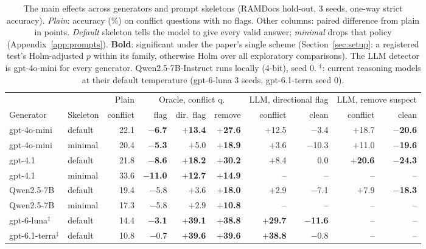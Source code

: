 \begin{table}[t]
\centering\small
\setlength{\tabcolsep}{4pt}
\begin{tabular}{llrrrrrrrr}
\toprule
& & Plain & \multicolumn{3}{c}{Oracle, conflict q.} & \multicolumn{2}{c}{LLM, directional flag} & \multicolumn{2}{c}{LLM, remove suspect} \\
\cmidrule(lr){4-6}\cmidrule(lr){7-8}\cmidrule(lr){9-10}
Generator & Skeleton & conflict & flag & dir.\ flag & remove & conflict & clean & conflict & clean \\
\midrule
gpt-4o-mini & default & 22.1 & \textbf{$-$6.7} & \textbf{$+$13.4} & \textbf{$+$27.6} & $+$12.5 & $-$3.4 & $+$18.7 & \textbf{$-$20.6} \\
gpt-4o-mini & minimal & 20.4 & \textbf{$-$5.3} & $+$5.0 & \textbf{$+$18.9} & $+$3.6 & $-$10.3 & $+$11.0 & \textbf{$-$19.6} \\
gpt-4.1 & default & 21.8 & \textbf{$-$8.6} & \textbf{$+$18.2} & \textbf{$+$30.2} & $+$8.4 & 0.0 & \textbf{$+$20.6} & \textbf{$-$24.3} \\
gpt-4.1 & minimal & 33.6 & \textbf{$-$11.0} & \textbf{$+$12.7} & \textbf{$+$14.9} & -- & -- & -- & -- \\
Qwen2.5-7B & default & 19.4 & $-$5.8 & $+$3.6 & \textbf{$+$18.0} & $+$2.9 & $-$7.1 & $+$7.9 & \textbf{$-$18.3} \\
Qwen2.5-7B & minimal & 17.3 & $-$5.8 & $+$2.9 & \textbf{$+$10.8} & -- & -- & -- & -- \\
gpt-6-luna$^\ddagger$ & default & 14.4 & \textbf{$-$3.1} & \textbf{$+$39.1} & \textbf{$+$38.8} & \textbf{$+$29.7} & \textbf{$-$11.6} & -- & -- \\
gpt-6.1-terra$^\ddagger$ & default & 10.8 & $-$0.7 & \textbf{$+$39.6} & \textbf{$+$39.6} & \textbf{$+$38.8} & $-$0.8 & -- & -- \\
\bottomrule
\end{tabular}
\caption{The main effects across generators and prompt skeletons (RAMDocs hold-out, 3 seeds, one-way strict
accuracy). \emph{Plain}: accuracy (\%) on conflict questions with no flags. Other columns: paired difference from plain
in points. \emph{Default} skeleton tells the model to give every valid answer; \emph{minimal} drops that policy
(Appendix~\ref{app:prompts}). \textbf{Bold}: significant under the paper's single scheme (Section~\ref{sec:setup}: a registered test's Holm-adjusted $p$ within its family, otherwise Holm over all exploratory comparisons). The LLM detector is gpt-4o-mini
for every generator. Qwen2.5-7B-Instruct runs locally (4-bit), seed 0. $^\ddagger$: current reasoning models at their
default temperature (gpt-6-luna 3 seeds, gpt-6.1-terra seed 0).}
\label{tab:generality}
\end{table}
